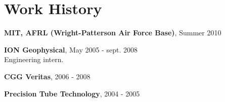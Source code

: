 \documentclass[letterpaper]{article}
\begin{document}
\section*{Work History}

\begin{flushleft}
\hspace{0.25in} {\bf MIT, AFRL (Wright-Patterson Air Force Base)}, Summer 2010\\
\end{flushleft}
\begin{flushleft}
\hspace{0.25in} {\bf ION Geophysical}, May 2005 - sept. 2008\\
\vspace{0.15in}
\hspace{0.75in} Engineering intern. \\
\end{flushleft}
\begin{flushleft}
\hspace{0.25in} {\bf CGG Veritas}, 2006 - 2008\\
\end{flushleft}
\begin{flushleft}
\hspace{0.25in} {\bf Precision Tube Technology}, 2004 - 2005 \\
\end{flushleft}
\end{document}
